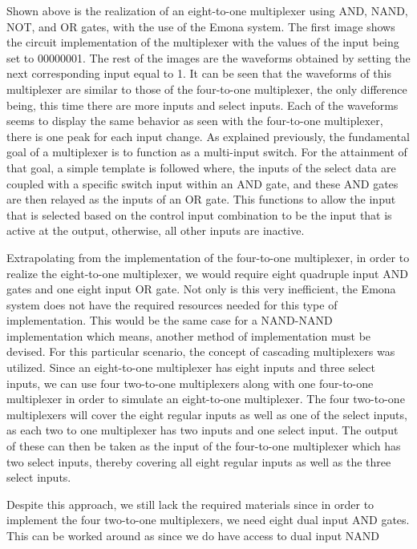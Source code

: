 \documentclass[12pt]{article}
\begin{document}
\par Shown above is the realization of an eight-to-one multiplexer using AND,
NAND, NOT, and OR gates, with the use of the Emona system. The first image shows
the circuit implementation of the multiplexer with the values of the input being
set to 00000001. The rest of the images are the waveforms obtained by setting
the next corresponding input equal to 1. It can be seen that the waveforms of
this multiplexer are similar to those of the four-to-one multiplexer, the only
difference being, this time there are more inputs and select inputs. Each of the
waveforms seems to display the same behavior as seen with the four-to-one
multiplexer, there is one peak for each input change. As explained previously,
the fundamental goal of a multiplexer is to function as a multi-input switch.
For the attainment of that goal, a simple template is followed where, the inputs
of the select data are coupled with a specific switch input within an AND gate,
and these AND gates are then relayed as the inputs of an OR gate. This functions
to allow the input that is selected based on the control input combination to be
the input that is active at the output, otherwise, all other inputs are
inactive.
\par Extrapolating from the implementation of the four-to-one multiplexer, in
order to realize the eight-to-one multiplexer, we would require eight quadruple
input AND gates and one eight input OR gate. Not only is this very inefficient,
the Emona system does not have the required resources needed for this type of
implementation.  This would be the same case for a NAND-NAND implementation
which means, another method of implementation must be devised. For this
particular scenario, the concept of cascading multiplexers was utilized. Since
an eight-to-one multiplexer has eight inputs and three select inputs, we can use
four two-to-one multiplexers along with one four-to-one multiplexer in order to
simulate an eight-to-one multiplexer. The four two-to-one multiplexers will
cover the eight regular inputs as well as one of the select inputs, as each two
to one multiplexer has two inputs and one select input. The output of these can
then be taken as the input of the four-to-one multiplexer which has two select
inputs, thereby covering all eight regular inputs as well as the three select
inputs.
\par Despite this approach, we still lack the required materials since in order
to implement the four two-to-one multiplexers, we need eight dual input AND
gates. This can be worked around as since we do have access to dual input NAND
\end{document}
